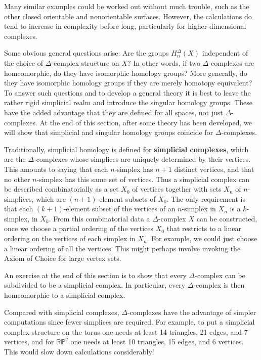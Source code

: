 Many similar examples could be worked out without much trouble, such as the
other closed orientable and nonorientable surfaces. However, the calculations do tend
to increase in complexity before long, particularly for higher-dimensional complexes.

Some obvious general questions arise: Are the groups $H^\Delta_n(X)$ independent of
the choice of $\Delta$-complex structure on $X$? In other words, if two $\Delta$-complexes are
homeomorphic, do they have isomorphic homology groups? More generally, do they
have isomorphic homology groups if they are merely homotopy equivalent? To answer
such questions and to develop a general theory it is best to leave the rather rigid
simplicial realm and introduce the singular homology groups. These have the added
advantage that they are defined for all spaces, not just $\Delta$-complexes. At the end of
this section, after some theory has been developed, we will show that simplicial and
singular homology groups coincide for $\Delta$-complexes.

Traditionally, simplicial homology is defined for \textbf{simplicial complexes}, which are
the $\Delta$-complexes whose simplices are uniquely determined by their vertices. This
amounts to saying that each $n$-simplex has $n + 1$ distinct vertices, and that no other
$n$-simplex has this same set of vertices. Thus a simplicial complex can be described
combinatorially as a set $X_0$ of vertices together with sets $X_n$ of $n$-simplices, which
are $(n+1)$-element subsets of $X_0$. The only requirement is that each $(k+1)$-element
subset of the vertices of an $n$-simplex in $X_n$ is a $k$-simplex, in $X_k$. From this combinatorial data a $\Delta$-complex $X$ can be constructed, once we choose a partial ordering
of the vertices $X_0$ that restricts to a linear ordering on the vertices of each simplex
in $X_n$. For example, we could just choose a linear ordering of all the vertices. This
might perhaps involve invoking the Axiom of Choice for large vertex sets.

An exercise at the end of this section is to show that every $\Delta$-complex can be
subdivided to be a simplicial complex. In particular, every $\Delta$-complex is then homeomorphic to a simplicial complex.

Compared with simplicial complexes, $\Delta$-complexes have the advantage of simpler
computations since fewer simplices are required. For example, to put a simplicial
complex structure on the torus one needs at least 14 triangles, 21 edges, and 7 vertices,
and for $\mathbb{RP}^2$ one needs at least 10 triangles, 15 edges, and 6 vertices. This would slow
down calculations considerably!

